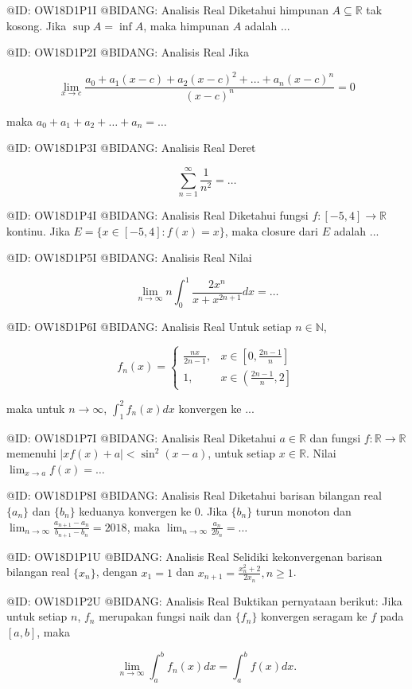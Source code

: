 @ID: OW18D1P1I
@BIDANG: Analisis Real
Diketahui himpunan $A \subseteq \mathbb{R}$ tak kosong. Jika $\sup A = \inf A$, maka himpunan $A$ adalah ...

@ID: OW18D1P2I
@BIDANG: Analisis Real
Jika

$$
\lim_{x \to c} \frac{a_0 + a_1(x-c) + a_2(x-c)^2 + \dots + a_n(x-c)^n}{(x-c)^n} = 0
$$

maka $a_0 + a_1 + a_2 + \dots + a_n = \dots$

@ID: OW18D1P3I
@BIDANG: Analisis Real
Deret

$$
\sum_{n=1}^{\infty} \frac{1}{n^2} = \dots
$$

@ID: OW18D1P4I
@BIDANG: Analisis Real
Diketahui fungsi $f: [-5, 4] \to \mathbb{R}$ kontinu. Jika $E = \{x \in [-5, 4] : f(x) = x\}$, maka closure dari $E$ adalah ...

@ID: OW18D1P5I
@BIDANG: Analisis Real
Nilai

$$
\lim_{n \to \infty} n \int_0^1 \frac{2x^n}{x + x^{2n+1}} dx = \dots
$$

@ID: OW18D1P6I
@BIDANG: Analisis Real
Untuk setiap $n \in \mathbb{N}$,

$$
f_n(x) = \begin{cases} \frac{nx}{2n-1}, & x \in \left[0, \frac{2n-1}{n}\right] \\ 1, & x \in \left(\frac{2n-1}{n}, 2\right] \end{cases}
$$

maka untuk $n \to \infty$, $\int_1^2 f_n(x) dx$ konvergen ke ...

@ID: OW18D1P7I
@BIDANG: Analisis Real
Diketahui $a \in \mathbb{R}$ dan fungsi $f: \mathbb{R} \to \mathbb{R}$ memenuhi $|xf(x) + a| < \sin^2(x - a)$, untuk setiap $x \in \mathbb{R}$. Nilai $\lim_{x \to a} f(x) = \dots$

@ID: OW18D1P8I
@BIDANG: Analisis Real
Diketahui barisan bilangan real $\{a_n\}$ dan $\{b_n\}$ keduanya konvergen ke 0. Jika $\{b_n\}$ turun monoton dan $\lim_{n \to \infty} \frac{a_{n+1} - a_n}{b_{n+1} - b_n} = 2018$, maka $\lim_{n \to \infty} \frac{a_n}{2b_n} = \dots$

@ID: OW18D1P1U
@BIDANG: Analisis Real
Selidiki kekonvergenan barisan bilangan real $\{x_n\}$, dengan $x_1 = 1$ dan $x_{n+1} = \frac{x_n^2 + 2}{2x_n}, n \ge 1$.

@ID: OW18D1P2U
@BIDANG: Analisis Real
Buktikan pernyataan berikut: Jika untuk setiap $n$, $f_n$ merupakan fungsi naik dan $\{f_n\}$ konvergen seragam ke $f$ pada $[a, b]$, maka

$$
\lim_{n \to \infty} \int_a^b f_n(x) dx = \int_a^b f(x) dx.
$$

